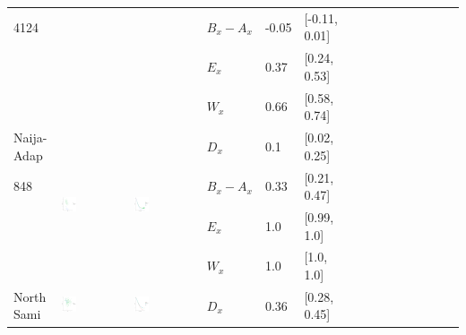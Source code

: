 \documentclass[11pt,letterpaper]{article}
\begin{document}
\begin{longtable}{lllllllllllllll}
4124  &    &    &  $B_x-A_x$  &  -0.05  &  [-0.11, 0.01]  \\ 
  &    &    &  $E_x$  &  0.37  &  [0.24, 0.53]  \\ 
  &    &    &  $W_x$  &  0.66  &  [0.58, 0.74]  \\ [10.25ex] \hline
Naija-Adap  &  \multirow{4}{*}{\includegraphics[width=0.25\textwidth]{figures/Naija-Adap-entropy-memory.pdf}}  &  \multirow{4}{*}{\includegraphics[width=0.25\textwidth]{figures/Naija-Adap-listener-surprisal-memory.pdf}}  &  $D_x$  &  0.1  &  [0.02, 0.25]  \\ 
848  &    &    &  $B_x-A_x$  &  0.33  &  [0.21, 0.47]  \\ 
  &    &    &  $E_x$  &  1.0  &  [0.99, 1.0]  \\ 
  &    &    &  $W_x$  &  1.0  &  [1.0, 1.0]  \\ [10.25ex] \hline
North Sami  &  \multirow{4}{*}{\includegraphics[width=0.25\textwidth]{figures/North_Sami-entropy-memory.pdf}}  &  \multirow{4}{*}{\includegraphics[width=0.25\textwidth]{figures/North_Sami-listener-surprisal-memory.pdf}}  &  $D_x$  &  0.36  &  [0.28, 0.45]  \\ 

\end{longtable}
\end{document}
